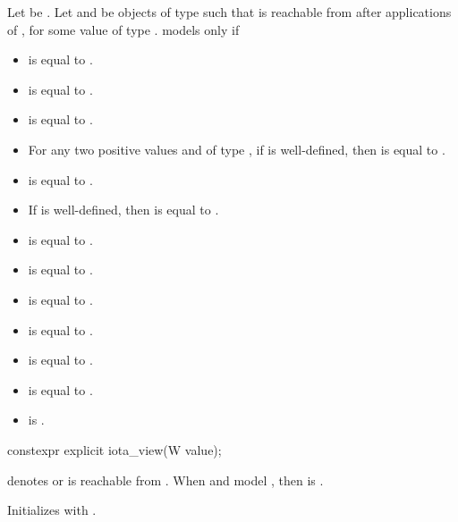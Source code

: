 Let  be .
Let  and  be objects of type  such that
 is reachable from 
after  applications of ,
for some value  of type .
 models  only if
\begin{itemize}
\item {} is equal to .
\item {} is equal to .
\item {} is equal to .
\item For any two positive values
   and  of type ,
  if  is well-defined, then
   is equal to .
\item {} is equal to .
\item If  is well-defined, then
   is equal to .
\item {} is equal to .
\item {} is equal to .
\item {} is equal to .
\item {} is equal to .
\item {} is equal to .
\item {} is equal to .
\item {} is .
\end{itemize}

%
\begin{itemdecl}
constexpr explicit iota_view(W value);
\end{itemdecl}

\begin{itemdescr}
\pnum
\expects
{} denotes  or
 is reachable from .
When  and  model ,
then  is .

\pnum
\effects
Initializes  with .
\end{itemdescr}

